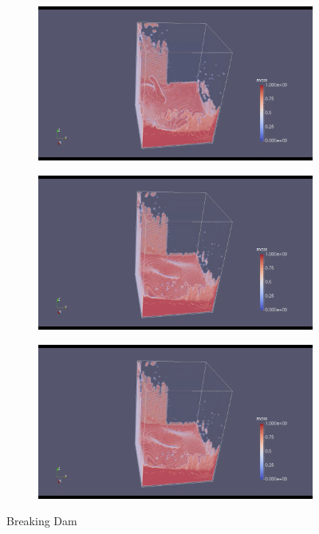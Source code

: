 \documentclass[10pt,a4paper,notitlepage]{article}
\begin{document}
\begin{figure}[H]
\begin{subfigure}{0.25\textwidth}
\end{subfigure}
\centering
\begin{subfigure}{0.25\textwidth}
  \includegraphics[width=1.0\linewidth]{dam/7.png}
\end{subfigure}%
\begin{subfigure}{0.25\textwidth}
  \includegraphics[width=1.0\linewidth]{dam/8.png}
\end{subfigure}
\begin{subfigure}{0.25\textwidth}
  \includegraphics[width=1.0\linewidth]{dam/9.png}
\end{subfigure}
\caption{Breaking Dam}
\label{fig:dam}
\end{figure}
\end{document}

